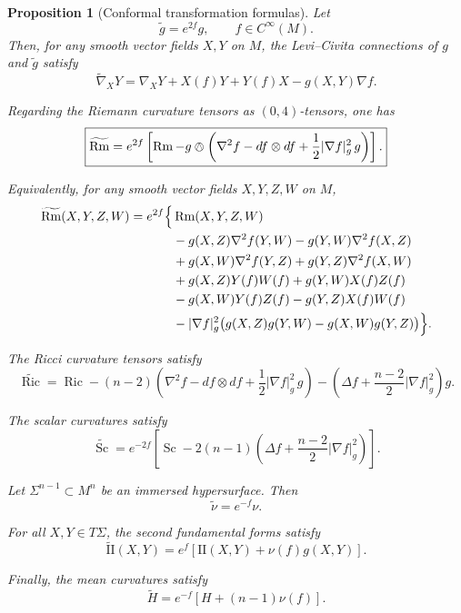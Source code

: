 \documentclass[11pt]{article}
\newtheorem{proposition}[theorem]{Proposition}
\newcommand{\Rm}{\operatorname{Rm}}
\newcommand{\Ric}{\operatorname{Ric}}
\newcommand{\Sc}{\operatorname{Sc}}
\newcommand{\II}{\mathrm{I\!I}}
\begin{document}
\begin{proposition}[Conformal transformation formulas]
Let
\[
\widetilde g=e^{2f}g,
\qquad
f\in C^\infty(M).
\]
Then, for any smooth vector fields \(X,Y\) on \(M\), the Levi--Civita
connections of \(g\) and \(\widetilde g\) satisfy
\[
\widetilde{\nabla}_X Y
=
\nabla_XY
+
X(f)Y
+
Y(f)X
-
g(X,Y)\nabla f.
\]

Regarding the Riemann curvature tensors as \((0,4)\)-tensors, one has
\[
\boxed{
\widetilde{\Rm}
=
e^{2f}
\left[
\Rm
-
g\owedge
\left(
\nabla^2f
-
df\otimes df
+
\frac12|\nabla f|_g^2\, g
\right)
\right].
}
\]

Equivalently, for any smooth vector fields \(X,Y,Z,W\) on \(M\),
\[
\begin{aligned}
\widetilde{\Rm}(X,Y,Z,W)
=
e^{2f}\Bigl\{
&\Rm(X,Y,Z,W)
\\
&-g(X,Z)\nabla^2f(Y,W)
-g(Y,W)\nabla^2f(X,Z)
\\
&+g(X,W)\nabla^2f(Y,Z)
+g(Y,Z)\nabla^2f(X,W)
\\
&+g(X,Z)Y(f)W(f)
+g(Y,W)X(f)Z(f)
\\
&-g(X,W)Y(f)Z(f)
-g(Y,Z)X(f)W(f)
\\
&-|\nabla f|_g^2
\bigl(
g(X,Z)g(Y,W)
-
g(X,W)g(Y,Z)
\bigr)
\Bigr\}.
\end{aligned}
\]

The Ricci curvature tensors satisfy
\[
\boxed{
\widetilde{\Ric}
=
\Ric
-
(n-2)
\left(
\nabla^2f
-
df\otimes df
+
\frac12|\nabla f|_g^2\, g
\right)
-
\left(
\Delta f+\frac{n-2}{2}|\nabla f|_g^2
\right)g
.
}
\]

The scalar curvatures satisfy
\[
\boxed{
\widetilde{\Sc}
=
e^{-2f}
\left[
\Sc
-
2(n-1)
\left(
\Delta f
+
\frac{n-2}{2}|\nabla f|_g^2
\right)
\right].
}
\]

Let \(\Sigma^{n-1}\subset M^n\) be an immersed hypersurface. Then
\[
\boxed{
\widetilde{\nu}=e^{-f}\nu.
}
\]

For all \(X,Y\in T\Sigma\), the second fundamental forms satisfy
\[
\boxed{
\widetilde{\II}(X,Y)
=
e^f
\left[
\II(X,Y)+\nu(f)g(X,Y)
\right].
}
\]

Finally, the mean curvatures satisfy
\[
\boxed{
\widetilde H
=
e^{-f}
\left[
H+(n-1)\nu(f)
\right].
}
\]
\end{proposition}
\end{document}
